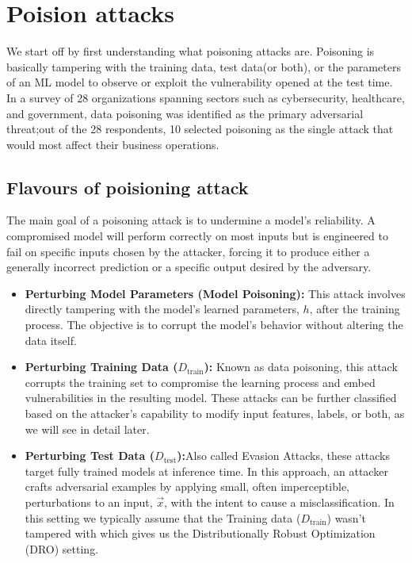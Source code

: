 \documentclass[11pt]{report}
\begin{document}

\maketitle



\section{Poision attacks}
We start off by first understanding what poisoning attacks are. Poisoning is basically tampering with the training data, test data(or both), or the parameters of an ML model to observe or exploit the vulnerability opened at the test time. In a survey \cite{DBLP:journals/corr/abs-2002-05646} of 28 organizations spanning sectors such as cybersecurity, healthcare, and government, data poisoning was identified as the primary adversarial threat;out of the 28 respondents, 10 selected poisoning as the single attack that would most affect their business operations.




\subsection{Flavours of poisioning attack}
The main goal of a poisoning attack is to undermine a model's reliability. A compromised model will perform correctly on most inputs but is engineered to fail on specific inputs chosen by the attacker, forcing it to produce either a generally incorrect prediction or a specific output desired by the adversary.
\begin{itemize}
    \item \textbf{Perturbing Model Parameters (Model Poisoning):} This attack involves directly tampering with the model's learned parameters, $h$, after the training process. The objective is to corrupt the model's behavior without altering the data itself.
    \item \textbf{Perturbing Training Data ($D_{\text{train}}$):} Known as data poisoning, this attack corrupts the training set to compromise the learning process and embed vulnerabilities in the resulting model. These attacks can be further classified based on the attacker's capability to modify input features, labels, or both, as we will see in detail later.

    
    
    \item \textbf{Perturbing Test Data ($D_{\text{test}}$):}Also called Evasion Attacks, these attacks target fully trained models at inference time. In this approach, an attacker crafts adversarial examples by applying small, often imperceptible, perturbations to an input, $\vec{x}$, with the intent to cause a misclassification. In this setting we typically assume that the Training data ($D_{\text{train}}$) wasn't tampered with which gives us the  Distributionally Robust Optimization (DRO) setting.
\end{itemize}
\end{document}
